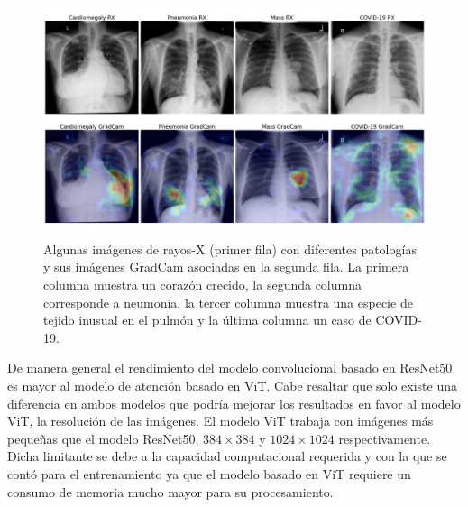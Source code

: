 \begin{figure}[ht!]
    \centering
    \includegraphics[width=0.8 \textwidth]{Chapters/4. ViT-Lung/images/vlgrid.png}
    \caption{Algunas imágenes de rayos-X (primer fila) con diferentes patologías y sus imágenes GradCam
             asociadas en la segunda fila. La primera columna muestra un corazón crecido, la segunda
             columna corresponde a neumonía, la tercer columna muestra una especie de tejido inusual
             en el pulmón y la última columna un caso de COVID-19.}
    \label{img-results}
\end{figure}

De manera general el rendimiento del modelo convolucional basado en ResNet50 es mayor al modelo de
atención basado en ViT. Cabe resaltar que solo existe una diferencia en ambos modelos que podría mejorar
los resultados en favor al modelo ViT, la resolución de las imágenes. El modelo ViT trabaja con imágenes
más pequeñas que el modelo ResNet50, $384\times384$ y $1024\times1024$ respectivamente. Dicha limitante
se debe a la capacidad computacional requerida y con la que se contó para el entrenamiento ya que el
modelo basado en ViT requiere un consumo de memoria mucho mayor para su procesamiento.

